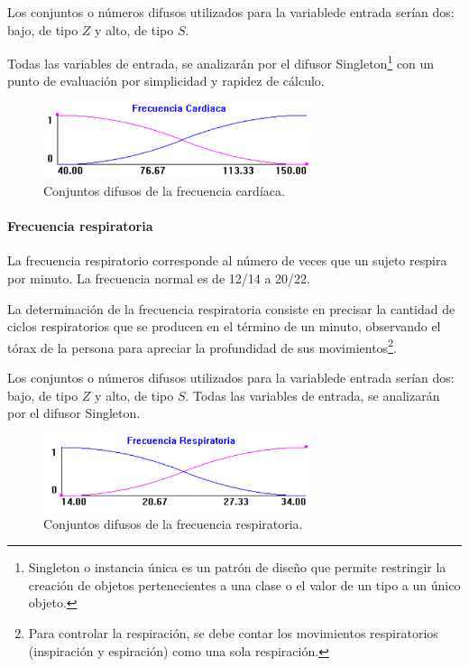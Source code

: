 \documentclass[a4paper, 11pt, titlepage]{article}
\begin{document}
        Los conjuntos o números difusos utilizados para la variablede entrada serían dos: bajo, de tipo $Z$ y 
        alto, de tipo $S$. 

        Todas las variables de entrada, se analizarán por el difusor Singleton\footnote{
            Singleton o instancia única es un patrón de diseño que permite restringir la creación de objetos 
            pertenecientes a una clase o el valor de un tipo a un único objeto.
        } con un punto de evaluación por 
        simplicidad y rapidez de cálculo.

        \begin{figure}[htp]
            \centering
            \includegraphics[width=0.7\textwidth]{resources/frecuenciacardiaca.png}
            \caption{Conjuntos difusos de la frecuencia cardíaca.}
            \label{frecuenciacardiaca}
        \end{figure}
    
        \paragraph{Frecuencia respiratoria} La frecuencia respiratorio corresponde al número de veces que 
        un sujeto respira por minuto. La frecuencia normal es de 12/14 a 20/22. 
        
        La determinación de la frecuencia respiratoria consiste  en  precisar  la  cantidad  de  ciclos 
        respiratorios  que  se producen  en  el  término  de  un  minuto,  observando  el  tórax  de  la  
        persona  para apreciar la profundidad de sus movimientos\footnote{
            Para controlar la respiración, se debe contar  los  movimientos  respiratorios  (inspiración  y  
            espiración)  como  una  sola respiración.
        }.

        Los conjuntos o números difusos utilizados para la variablede entrada serían dos: bajo, de tipo $Z$ y 
        alto, de tipo $S$. Todas las variables de entrada, se analizarán por el difusor Singleton.

        \begin{figure}[htp]
            \centering
            \includegraphics[width=0.7\textwidth]{resources/frecuenciarespiratoria.png}
            \caption{Conjuntos difusos de la frecuencia respiratoria.}
            \label{frecuenciarespiratoria}
        \end{figure}
\end{document}
